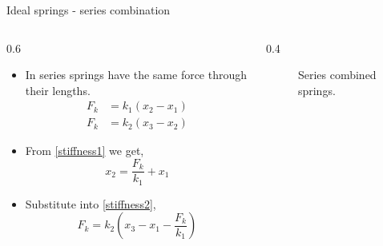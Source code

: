 \documentclass[11pt,aspectratio=169,handout]{beamer}
\begin{document}
\begin{frame}[c]{Ideal springs - series combination}
	\begin{columns}[T]
		\begin{column}{0.6\textwidth}
			\begin{itemize}
				\item In series springs have the same force through their lengths.
				\begin{align}\label{stiffness1}
					F_{k} &= k_1(x_2-x_1)\\
					F_{k} &= k_2(x_3-x_2)\label{stiffness2}
				\end{align}
			\item From \ref{stiffness1} we get,
			\begin{equation}
				x_2 = \frac{F_k}{k_1} + x_1
			\end{equation}
		\item Substitute into \ref{stiffness2},
		\begin{equation}
			F_k = k_2(x_3 -x_1 -\frac{F_k}{k_1})
		\end{equation}
			\end{itemize}
		\end{column}
		\begin{column}{0.4\textwidth}
			\begin{figure}
				\centering
				
				\caption{Series combined springs.}
			\end{figure}
		\end{column}
	\end{columns}
\end{frame}
\end{document}
